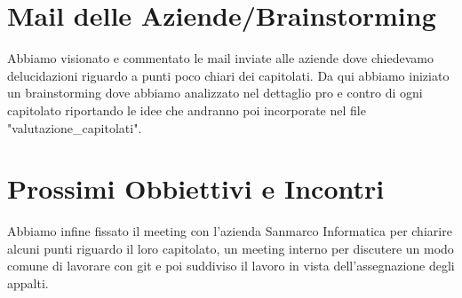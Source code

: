 \documentclass[12pt,a4paper]{article}
\begin{document}
\section{Mail delle Aziende/Brainstorming}
Abbiamo visionato e commentato le mail inviate alle aziende dove 
chiedevamo delucidazioni riguardo a punti poco chiari dei capitolati. 
Da qui abbiamo iniziato un brainstorming dove abbiamo analizzato 
nel dettaglio pro e contro di ogni capitolato riportando le idee 
che andranno poi incorporate nel file "valutazione\_capitolati".

\section{Prossimi Obbiettivi e Incontri}
Abbiamo infine fissato il meeting con l'azienda Sanmarco Informatica per chiarire 
alcuni punti riguardo il loro capitolato, un meeting interno per discutere 
un modo comune di lavorare con git e poi suddiviso il lavoro in vista dell'assegnazione 
degli appalti.
\end{document}
